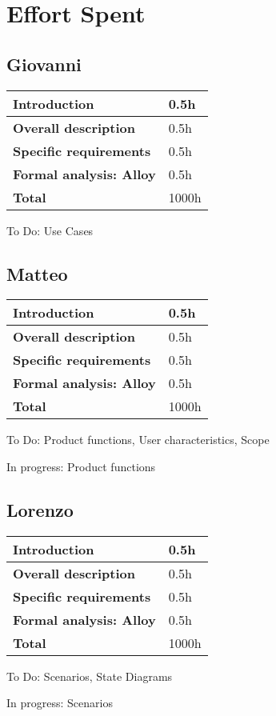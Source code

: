 \section{Effort Spent}
\subsection*{Giovanni}
\begin{table}[h]
    \begin{tabular}{|l|l|}
        \toprule
        \textbf{Introduction}           & 0.5h  \\ \midrule
        \textbf{Overall description}    & 0.5h  \\ \midrule
        \textbf{Specific requirements}  & 0.5h  \\ \midrule
        \textbf{Formal analysis: Alloy} & 0.5h  \\ \midrule
        \textbf{Total}                  & 1000h \\ \bottomrule
    \end{tabular}
\end{table}

To Do: Use Cases

\subsection*{Matteo}
\begin{table}[h]
    \begin{tabular}{|l|l|}
        \toprule
        \textbf{Introduction}           & 0.5h  \\ \midrule
        \textbf{Overall description}    & 0.5h  \\ \midrule
        \textbf{Specific requirements}  & 0.5h  \\ \midrule
        \textbf{Formal analysis: Alloy} & 0.5h  \\ \midrule
        \textbf{Total}                  & 1000h \\ \bottomrule
    \end{tabular}
\end{table}
To Do: Product functions, User characteristics, Scope

In progress: Product functions

\subsection*{Lorenzo}
\begin{table}[h]
    \begin{tabular}{|l|l|}
        \toprule
        \textbf{Introduction}           & 0.5h  \\ \midrule
        \textbf{Overall description}    & 0.5h  \\ \midrule
        \textbf{Specific requirements}  & 0.5h  \\ \midrule
        \textbf{Formal analysis: Alloy} & 0.5h  \\ \midrule
        \textbf{Total}                  & 1000h \\ \bottomrule
    \end{tabular}
\end{table}
To Do: Scenarios, State Diagrams

In progress: Scenarios

